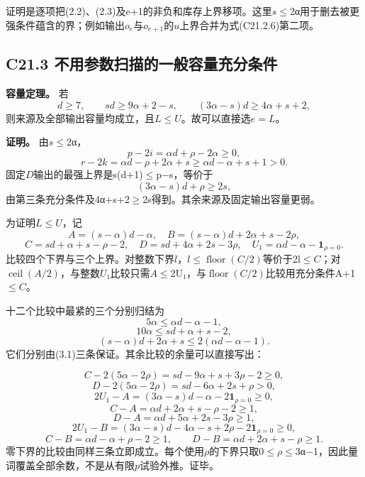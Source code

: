 \documentclass[11pt,a4paper]{article}
\theoremstyle{definition}
\numberwithin{equation}{section}
\begin{document}
{证明是逐项把(2.2)、(2.3)及e+1的非负和库存上界移项。这里\ensuremath{s}\ensuremath{\le}2α用于删去被更强条件蕴含的界；例如输出\ensuremath{o_{e}}与\ensuremath{o_{e+1}}的\ensuremath{u}上界合并为式(C21.2.6)第二项。}

\subsection*{\texorpdfstring{{C21.3} {不用参数扫描的一般容量充分条件}}{C21.3 不用参数扫描的一般容量充分条件}}\label{C21-h142}

\textbf{{容量定理。}} {若} \[
\boxed{
d\ge7,\qquad sd\ge9\alpha+2-s,\qquad
(3\alpha-s)d\ge4\alpha+s+2,
}
\tag{C21.3.1}
\] {则来源及全部输出容量均成立，且\ensuremath{L}\ensuremath{\le}\ensuremath{U}。故可以直接选\ensuremath{e=L}。}

\textbf{{证明。}} {由\ensuremath{s}\ensuremath{\le}2α，} \[
p-2i=\alpha d+\rho-2\alpha\ge0,
\] \[
r-2k=\alpha d-\rho+2\alpha+s
\ge\alpha d-\alpha+s+1>0.
\] {固定\ensuremath{D}输出的最强上界是s(d+1)\ensuremath{\le}p−s，等价于} \[
(3\alpha-s)d+\rho\ge2s,
\] {由第三条充分条件及4α+s+2\ensuremath{\ge}2s得到。其余来源及固定输出容量更弱。}

{为证明\ensuremath{L}\ensuremath{\le}\ensuremath{U}，记} \[
A=(s-\alpha)d-\alpha,\quad
B=(s-\alpha)d+2\alpha+s-2\rho,
\] \[
C=sd+\alpha+s-\rho-2,\quad
D=sd+4\alpha+2s-3\rho,\quad
U_1=\alpha d-\alpha-\mathbf1_{\rho=0}.
\] {比较四个下界与三个上界。对整数下界\ensuremath{l}，\ensuremath{l}\ensuremath{\le}\ensuremath{\operatorname{floor}(C/2)}等价于2l\ensuremath{\le}\ensuremath{C}；对\ensuremath{\operatorname{ceil}(A/2)}，与整数\ensuremath{U}₁比较只需\ensuremath{A}\ensuremath{\le}2U₁，与\ensuremath{\operatorname{floor}(C/2)}比较用充分条件A+1\ensuremath{\le}\ensuremath{C}。}

{十二个比较中最紧的三个分别归结为} \[
5\alpha\le\alpha d-\alpha-1,
\] \[
10\alpha\le sd+\alpha+s-2,
\] \[
(s-\alpha)d+2\alpha+s\le2(\alpha d-\alpha-1).
\] {它们分别由(3.1)三条保证。其余比较的余量可以直接写出：}

\[
C-2(5\alpha-2\rho)=sd-9\alpha+s+3\rho-2\ge0,
\] \[
D-2(5\alpha-2\rho)=sd-6\alpha+2s+\rho>0,
\] \[
2U_1-A=(3\alpha-s)d-\alpha-2\mathbf1_{\rho=0}\ge0,
\] \[
C-A=\alpha d+2\alpha+s-\rho-2\ge1,
\] \[
D-A=\alpha d+5\alpha+2s-3\rho\ge1,
\] \[
2U_1-B=(3\alpha-s)d-4\alpha-s+2\rho-2\mathbf1_{\rho=0}\ge0,
\] \[
C-B=\alpha d-\alpha+\rho-2\ge1,\qquad
D-B=\alpha d+2\alpha+s-\rho\ge1.
\] {零下界的比较由同样三条立即成立。每个使用\ensuremath{\rho }的下界只取0\ensuremath{\le}\ensuremath{\rho }\ensuremath{\le}3α−1，因此量词覆盖全部余数，不是从有限\ensuremath{p}试验外推。证毕。}
\end{document}
